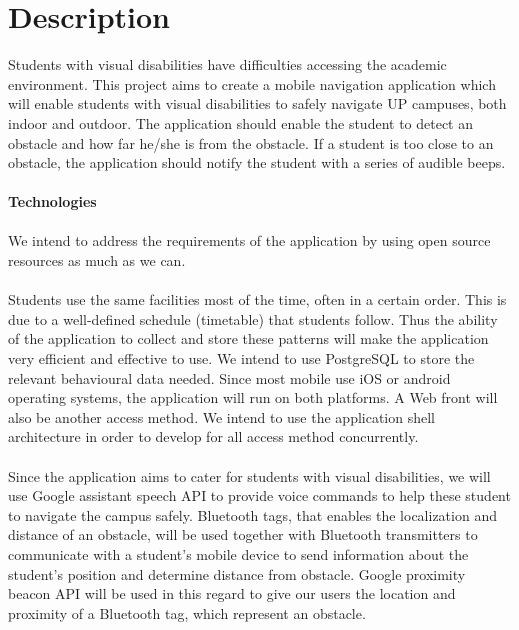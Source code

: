 \documentclass[runningheads,a4paper]{article}
\begin{document}
	\begingroup
	
	\tableofcontents
	\endgroup
	\newpage
	
	\section{Description}
	Students with visual disabilities have difficulties accessing the academic environment. This project aims to create a mobile navigation application which will enable students with visual disabilities to safely navigate UP campuses, both indoor and outdoor. The application should enable the student to detect an obstacle and how far he/she is from the obstacle. If a student is too close to an obstacle, the application should notify the student with a series of audible beeps. \\
   
    
    \textbf{\\Technologies\\} 
   \\ We intend to address the requirements of the application by using open source resources as much as we can.\\
    \\Students use the same facilities most of the time, often in a certain order. This is due to a well-defined schedule (timetable) that students follow. Thus the ability of the application to collect and store these patterns will make the application very efficient and effective to use. We intend to use PostgreSQL to store the relevant behavioural data needed. Since most mobile use iOS or android operating systems, the application will run on both platforms. A Web front will also be another access method. We intend to use the application shell architecture in order to develop for all access method concurrently.\\
    \\Since the application aims to cater for students with visual disabilities, we will use Google assistant speech API to provide voice commands to help these student to navigate the campus safely. Bluetooth tags, that enables the localization and distance of an obstacle, will be used together with Bluetooth transmitters to communicate with a student’s mobile device to send information about the student’s position and determine distance from obstacle. Google proximity beacon API will be used in this regard to give our users the location and proximity of a Bluetooth tag, which represent an obstacle. \\
   
\end{document}

